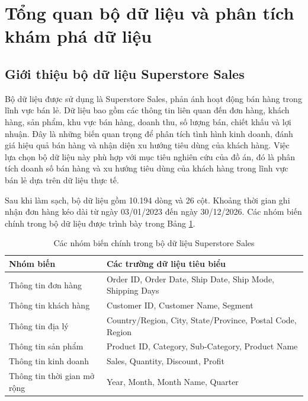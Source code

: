 \section{Tổng quan bộ dữ liệu và phân tích khám phá dữ liệu}

\subsection*{\thesubsection\quad Giới thiệu bộ dữ liệu Superstore Sales}

Bộ dữ liệu được sử dụng là Superstore Sales, phản ánh hoạt động bán hàng trong lĩnh vực bán lẻ. Dữ liệu bao gồm các thông tin liên quan đến đơn hàng, khách hàng, sản phẩm, khu vực bán hàng, doanh thu, số lượng bán, chiết khấu và lợi nhuận. Đây là những biến quan trọng để phân tích tình hình kinh doanh, đánh giá hiệu quả bán hàng và nhận diện xu hướng tiêu dùng của khách hàng. Việc lựa chọn bộ dữ liệu này phù hợp với mục tiêu nghiên cứu của đồ án, đó là phân tích doanh số bán hàng và xu hướng tiêu dùng của khách hàng trong lĩnh vực bán lẻ dựa trên dữ liệu thực tế.

Sau khi làm sạch, bộ dữ liệu gồm 10.194 dòng và 26 cột. Khoảng thời gian ghi nhận đơn hàng kéo dài từ ngày 03/01/2023 đến ngày 30/12/2026. Các nhóm biến chính trong bộ dữ liệu được trình bày trong Bảng \ref{tab:nhom-bien}.

\begin{table}[H]
\centering
\caption{Các nhóm biến chính trong bộ dữ liệu Superstore Sales}
\label{tab:nhom-bien}
\begin{tabular}{p{4cm} p{9cm}}
\hline
\textbf{Nhóm biến} & \textbf{Các trường dữ liệu tiêu biểu} \\
\hline
Thông tin đơn hàng & Order ID, Order Date, Ship Date, Ship Mode, Shipping Days \\
\hline
Thông tin khách hàng & Customer ID, Customer Name, Segment \\
\hline
Thông tin địa lý & Country/Region, City, State/Province, Postal Code, Region \\
\hline
Thông tin sản phẩm & Product ID, Category, Sub-Category, Product Name \\
\hline
Thông tin kinh doanh & Sales, Quantity, Discount, Profit \\
\hline
Thông tin thời gian mở rộng & Year, Month, Month Name, Quarter \\
\hline
\end{tabular}
\end{table}

